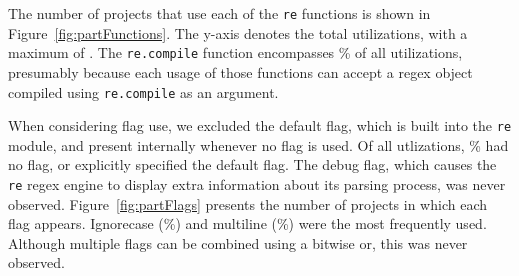 The number of projects that use each of the {\tt re} functions is shown in Figure~\ref{fig:partFunctions}.  The y-axis denotes the total utilizations, with a maximum of . The {\tt re.compile} function encompasses \% of all utilizations, presumably because each usage of those functions can accept a regex object compiled using {\tt re.compile} as an argument.

When considering flag use, we excluded the default flag, which is built into the {\tt re} module, and present internally whenever no flag is used.  Of all utlizations, \% had no flag, or explicitly specified the default flag.  The debug flag, which causes the {\tt re} regex engine to display extra information about its parsing process, was never observed.
 Figure~\ref{fig:partFlags} presents the number of projects in which each flag appears. Ignorecase (\%) and multiline (\%) were the most frequently used.   Although multiple flags can be combined using a bitwise or, this was never observed.



